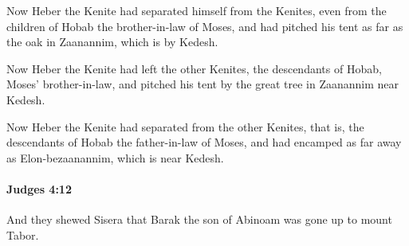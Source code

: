 			\begin{versebox}
					\item[BHS] 
					\item[ASV] Now Heber the Kenite had separated himself from the Kenites, even from the children of Hobab the brother-in-law of Moses, and had pitched his tent as far as the oak in Zaanannim, which is by Kedesh.
					\item[NIV] Now Heber the Kenite had left the other Kenites, the descendants of Hobab, Moses’ brother-in-law, and pitched his tent by the great tree in Zaanannim near Kedesh.
					\item[NRSV] Now Heber the Kenite had separated from the other Kenites, that is, the descendants of Hobab the father-in-law of Moses, and had encamped as far away as Elon-bezaanannim, which is near Kedesh.
			\end{versebox}

		\paragraph{Judges 4:12} %
			\label{JUDGES-4-12}

			And they shewed Sisera that Barak the son of Abinoam was gone up to mount Tabor.

